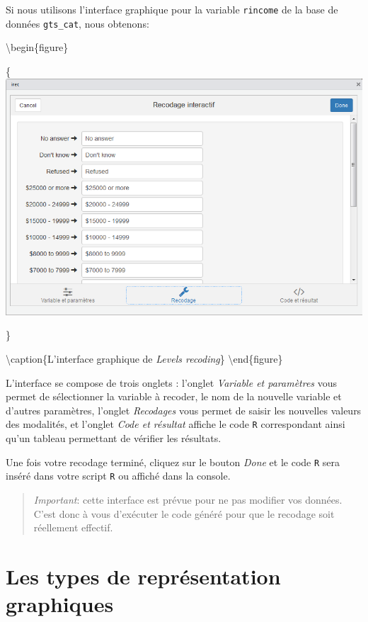 \documentclass[]{book}
\theoremstyle{definition}
\theoremstyle{definition}
\theoremstyle{definition}
\theoremstyle{remark}
\begin{document}
Si nous utilisons l'interface graphique pour la variable
\texttt{rincome} de la base de données \texttt{gts\_cat}, nous obtenons:

\textbackslash{}begin\{figure\}

\{\centering \includegraphics[width=1\linewidth]{images/irec}

\}

\textbackslash{}caption\{L'interface graphique de \emph{Levels
recoding}\}\label{fig:irec} \textbackslash{}end\{figure\}

L'interface se compose de trois onglets : l'onglet \emph{Variable et
paramètres} vous permet de sélectionner la variable à recoder, le nom de
la nouvelle variable et d'autres paramètres, l'onglet \emph{Recodages}
vous permet de saisir les nouvelles valeurs des modalités, et l'onglet
\emph{Code et résultat} affiche le code \texttt{R} correspondant ainsi
qu'un tableau permettant de vérifier les résultats.

Une fois votre recodage terminé, cliquez sur le bouton \emph{Done} et le
code \texttt{R} sera inséré dans votre script \texttt{R} ou affiché dans
la console.

\begin{quote}
\emph{Important}: cette interface est prévue pour ne pas modifier vos
données. C'est donc à vous d'exécuter le code généré pour que le
recodage soit réellement effectif.
\end{quote}

\hypertarget{graphiques}{%
\chapter{Les types de représentation graphiques}\label{graphiques}}
\end{document}
